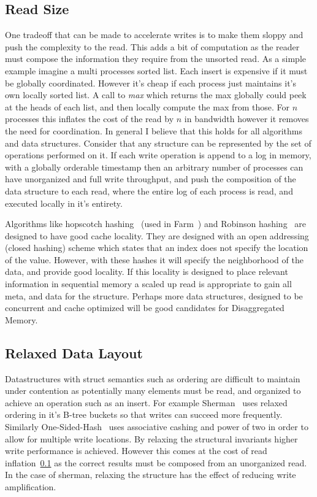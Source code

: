 \subsection{Read Size} 
\label{sec:readsize}
One tradeoff that can be made to accelerate writes is to make
them sloppy and push the complexity to the read. This adds a bit of computation
as the reader must compose the information they require from the unsorted read.
As a simple example imagine a multi processes sorted list. Each insert is
expensive if it must be globally coordinated. However it's cheap if each process
just maintains it's own locally sorted list. A call to \textit{max} which
returns the max globally could peek at the heads of each list, and then locally
compute the max from those. For $n$ processes this inflates the cost of the read
by $n$ in bandwidth however it removes the need for coordination. In general I
believe that this holds for all algorithms and data structures. Consider that any
structure can be represented by the set of operations performed on it. If each
write operation is append to a log in memory, with a globally orderable
timestamp then an arbitrary number of processes can have unorganized and full
write throughput, and push the composition of the data structure to each read,
where the entire log of each process is read, and executed locally in it's
entirety.

Algorithms like hopscotch hashing~\cite{hopscotch} (used in Farm~\cite{farm})
and Robinson hashing~\cite{robinhood} are designed to have good cache locality.
They are designed with an open addressing (closed hashing) scheme which states
that an index does not specify the location of the value. However, with these
hashes it will specify the neighborhood of the data, and provide good locality.
If this locality is designed to place relevant information in sequential memory
a scaled up read is appropriate to gain all meta, and data for the structure.
Perhaps more data structures, designed to be concurrent and cache optimized will
be good candidates for Disaggregated Memory.

\subsection{Relaxed Data Layout} Datastructures with struct semantics such as
ordering are difficult to maintain under contention as potentially many elements
must be read, and organized to achieve an operation such as an insert. For
example Sherman~\cite{sherman} uses relaxed ordering in it's B-tree buckets so
that writes can succeed more frequently. Similarly
One-Sided-Hash~\cite{one-sided-hash} uses associative cashing and power of two
in order to allow for multiple write locations. By relaxing the structural
invariants higher write performance is achieved. However this comes at the cost
of read inflation~\ref{sec:readsize} as the correct results must be composed
from an unorganized read. In the case of sherman, relaxing the structure has the
effect of reducing write amplification.


